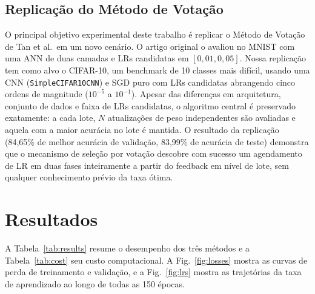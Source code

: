 \documentclass[conference]{IEEEtran}
\begin{document}
\subsection{Replicação do Método de Votação}

O principal objetivo experimental deste trabalho é replicar o Método de Votação de Tan et al.\ em um novo cenário. O artigo original o avaliou no MNIST com uma ANN de duas camadas e LRs candidatas em $[0{,}01, 0{,}05]$. Nossa replicação tem como alvo o CIFAR-10, um benchmark de 10 classes mais difícil, usando uma CNN (\texttt{SimpleCIFAR10CNN}) e SGD puro com LRs candidatas abrangendo cinco ordens de magnitude ($10^{-5}$ a $10^{-1}$). Apesar das diferenças em arquitetura, conjunto de dados e faixa de LRs candidatas, o algoritmo central é preservado exatamente: a cada lote, $N$ atualizações de peso independentes são avaliadas e aquela com a maior acurácia no lote é mantida. O resultado da replicação (84,65\% de melhor acurácia de validação, 83,99\% de acurácia de teste) demonstra que o mecanismo de seleção por votação descobre com sucesso um agendamento de LR em duas fases inteiramente a partir do feedback em nível de lote, sem qualquer conhecimento prévio da taxa ótima.

\section{Resultados}

A Tabela~\ref{tab:results} resume o desempenho dos três métodos e a Tabela~\ref{tab:cost} seu custo computacional. A Fig.~\ref{fig:losses} mostra as curvas de perda de treinamento e validação, e a Fig.~\ref{fig:lrs} mostra as trajetórias da taxa de aprendizado ao longo de todas as 150 épocas.

\begin{table}[htbp]
\caption{Comparação de Desempenho Entre os Métodos (150 Épocas)}
\begin{center}
\end{center}
\label{tab:results}
\end{table}
\end{document}

